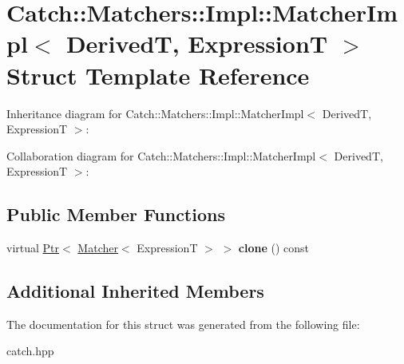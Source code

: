 \hypertarget{structCatch_1_1Matchers_1_1Impl_1_1MatcherImpl}{}\section{Catch\+:\+:Matchers\+:\+:Impl\+:\+:Matcher\+Impl$<$ DerivedT, ExpressionT $>$ Struct Template Reference}
\label{structCatch_1_1Matchers_1_1Impl_1_1MatcherImpl}


Inheritance diagram for Catch\+:\+:Matchers\+:\+:Impl\+:\+:Matcher\+Impl$<$ DerivedT, ExpressionT $>$\+:


Collaboration diagram for Catch\+:\+:Matchers\+:\+:Impl\+:\+:Matcher\+Impl$<$ DerivedT, ExpressionT $>$\+:
\subsection*{Public Member Functions}
\begin{DoxyCompactItemize}
\item 
virtual \hyperlink{classCatch_1_1Ptr}{Ptr}$<$ \hyperlink{structCatch_1_1Matchers_1_1Impl_1_1Matcher}{Matcher}$<$ ExpressionT $>$ $>$ {\bfseries clone} () const \hypertarget{structCatch_1_1Matchers_1_1Impl_1_1MatcherImpl_afe2e10779f91394f80ff5c894fb1bfab}{}\label{structCatch_1_1Matchers_1_1Impl_1_1MatcherImpl_afe2e10779f91394f80ff5c894fb1bfab}

\end{DoxyCompactItemize}
\subsection*{Additional Inherited Members}


The documentation for this struct was generated from the following file\+:\begin{DoxyCompactItemize}
\item 
catch.\+hpp\end{DoxyCompactItemize}
